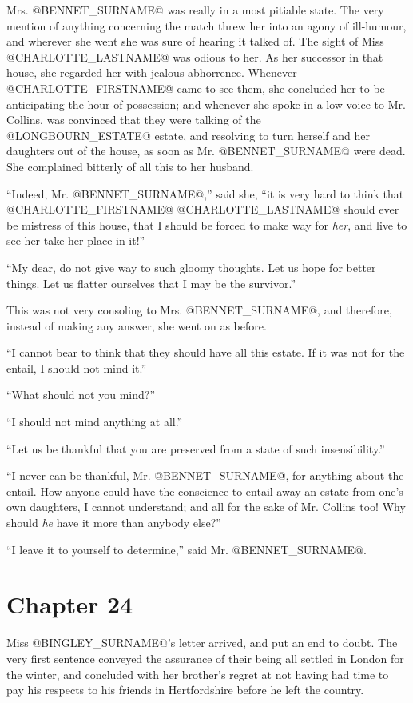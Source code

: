 Mrs. @BENNET_SURNAME@ was really in a most pitiable state. The very mention of
anything concerning the match threw her into an agony of ill-humour,
and wherever she went she was sure of hearing it talked of. The sight
of Miss @CHARLOTTE_LASTNAME@ was odious to her. As her successor in that house, she
regarded her with jealous abhorrence. Whenever @CHARLOTTE_FIRSTNAME@ came to see
them, she concluded her to be anticipating the hour of possession; and
whenever she spoke in a low voice to Mr. Collins, was convinced that
they were talking of the @LONGBOURN_ESTATE@ estate, and resolving to turn herself
and her daughters out of the house, as soon as Mr. @BENNET_SURNAME@ were dead. She
complained bitterly of all this to her husband.

``Indeed, Mr. @BENNET_SURNAME@,'' said she, ``it is very hard to think that @CHARLOTTE_FIRSTNAME@
@CHARLOTTE_LASTNAME@ should ever be mistress of this house, that I should be forced to
make way for \textit{her}, and live to see her take her place in it!''

``My dear, do not give way to such gloomy thoughts. Let us hope for
better things. Let us flatter ourselves that I may be the survivor.''

This was not very consoling to Mrs. @BENNET_SURNAME@, and therefore, instead of
making any answer, she went on as before.

``I cannot bear to think that they should have all this estate. If it was
not for the entail, I should not mind it.''

``What should not you mind?''

``I should not mind anything at all.''

``Let us be thankful that you are preserved from a state of such
insensibility.''

``I never can be thankful, Mr. @BENNET_SURNAME@, for anything about the entail. How
anyone could have the conscience to entail away an estate from one's own
daughters, I cannot understand; and all for the sake of Mr. Collins too!
Why should \textit{he} have it more than anybody else?''

``I leave it to yourself to determine,'' said Mr. @BENNET_SURNAME@.



\chapter*{Chapter 24}


Miss @BINGLEY_SURNAME@'s letter arrived, and put an end to doubt. The very first
sentence conveyed the assurance of their being all settled in London for
the winter, and concluded with her brother's regret at not having had
time to pay his respects to his friends in Hertfordshire before he left
the country.

